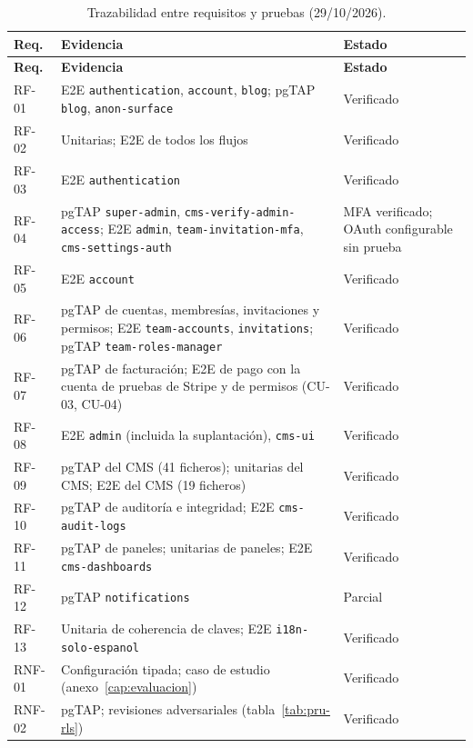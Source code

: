 \begin{longtable}{@{}l>{\raggedright\arraybackslash}p{8.4cm}>{\raggedright\arraybackslash}p{3.6cm}@{}}
  \caption{Trazabilidad entre requisitos y pruebas (29/10/2026).}\label{tab:pru-trazabilidad}\\
  \toprule
  \textbf{Req.} & \textbf{Evidencia} & \textbf{Estado} \\
  \midrule
  \endfirsthead
  \toprule
  \textbf{Req.} & \textbf{Evidencia} & \textbf{Estado} \\
  \midrule
  \endhead
  \bottomrule
  \endfoot
  RF-01 & E2E \texttt{authentication}, \texttt{account}, \texttt{blog}; pgTAP \texttt{blog}, \texttt{anon-surface} & Verificado \\
  RF-02 & Unitarias; E2E de todos los flujos & Verificado \\
  RF-03 & E2E \texttt{authentication} & Verificado \\
  RF-04 & pgTAP \texttt{super-admin}, \texttt{cms-verify-admin-access}; E2E \texttt{admin}, \texttt{team-invitation-mfa}, \texttt{cms-settings-auth} & MFA verificado; OAuth configurable sin prueba \\
  RF-05 & E2E \texttt{account} & Verificado \\
  RF-06 & pgTAP de cuentas, membresías, invitaciones y permisos; E2E \texttt{team-accounts}, \texttt{invitations}; pgTAP \texttt{team-roles-manager} & Verificado \\
  RF-07 & pgTAP de facturación; E2E de pago con la cuenta de pruebas de Stripe y de permisos (CU-03, CU-04) & Verificado \\
  RF-08 & E2E \texttt{admin} (incluida la suplantación), \texttt{cms-ui} & Verificado \\
  RF-09 & pgTAP del CMS (41 ficheros); unitarias del CMS; E2E del CMS (19 ficheros) & Verificado \\
  RF-10 & pgTAP de auditoría e integridad; E2E \texttt{cms-audit-logs} & Verificado \\
  RF-11 & pgTAP de paneles; unitarias de paneles; E2E \texttt{cms-dashboards} & Verificado \\
  RF-12 & pgTAP \texttt{notifications} & Parcial \\
  RF-13 & Unitaria de coherencia de claves; E2E \texttt{i18n-solo-espanol} & Verificado \\
  RNF-01 & Configuración tipada; caso de estudio (anexo~\ref{cap:evaluacion}) & Verificado \\
  RNF-02 & pgTAP; revisiones adversariales (tabla~\ref{tab:pru-rls}) & Verificado \\

\end{longtable}
